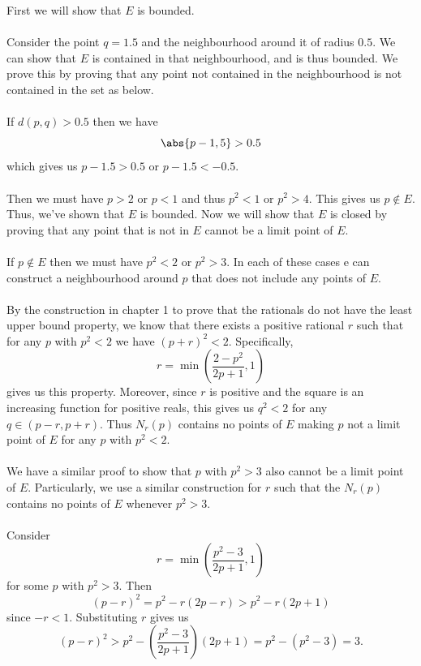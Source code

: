 \documentclass[12pt,letterpaper]{hmcpset}
\begin{document}
\begin{solution}
	First we will show that $E$ is bounded.\\\\
	Consider the point $q  = 1.5$ and the neighbourhood around it of radius $0.5$. We can show that $E$ is contained in that neighbourhood, and is thus bounded. We prove this by proving that any point not contained in the neighbourhood is not contained in the set as below.\\\\
	If \( d(p, q) > 0.5 \) then we have
	\[
		\abs{p - 1,5} > 0.5
	\]
	which gives us
	\( p - 1.5 > 0.5 \) or \( p - 1.5 < -0.5 \).\\\\
	Then we must have \( p > 2 \) or \( p < 1\) and thus \( p^2 < 1 \) or \( p^2 > 4 \). This gives us \( p \notin E \). Thus, we've shown that  $E$ is bounded.
	Now we will show that $E$ is closed by proving that any point that is not in $E$ cannot be a limit point of $E$.\\\\
	If \( p \notin E\) then we must have \( p^2 < 2 \) or \( p^2 > 3 \). In each of these cases e can construct a neighbourhood around $p$ that does not include any points of $E$.\\\\
	By the construction in chapter 1 to prove that the rationals do not have the least upper bound property, we know that there exists a positive rational $r$ such that for any $p$ with \( p^2 < 2 \) we have \( (p + r)^2 < 2 \). Specifically,
	\[
		r = \min{(\frac{2 - p^2}{2p + 1}, 1)}
	\]
	gives us this property. Moreover, since $r$ is positive and the square is an increasing function for positive reals, this gives us \( q^2 < 2 \) for any \( q \in (p - r, p + r) \). Thus $N_r(p)$ contains no points of $E$ making $p$ not a limit point of $E$ for any $p$ with \( p^2 < 2 \).\\\\
	We have a similar proof to show that $p$ with \( p^2 > 3 \) also cannot be a limit point of $E$. Particularly, we use a similar construction for $r$ such that the $N_r(p)$ contains no points of $E$ whenever \( p^2 > 3 \).\\\\
	Consider 
	\[
		r = \min{(\frac{p^2 - 3}{2p + 1}, 1)}
	\]
	for some $p$ with \( p^2 > 3 \).
	Then
	\[
		(p - r)^2 = p^2 - r(2p - r) > p^2 - r(2p + 1)
	\]
	since \( -r < 1 \). Substituting $r$ gives us
	\[
		(p - r)^2 > p^2 - (\frac{p^2 - 3}{2p + 1})(2p + 1) = p^2 - (p^2 - 3) = 3.
\]
\end{solution}
\end{document}
